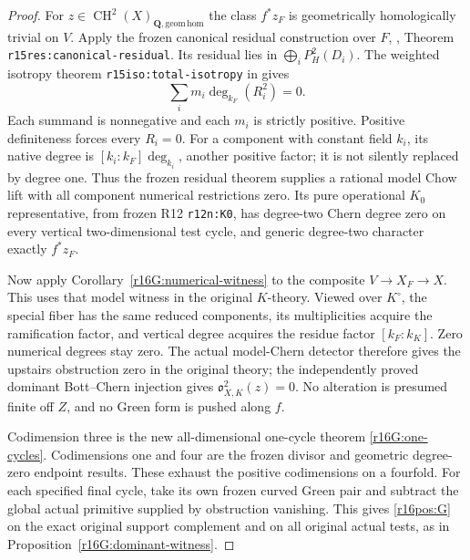\begin{proof}
For $z\in\operatorname{CH}^2(X)_{\mathbf Q,\mathrm{geom\,hom}}$
the class $f^*z_F$ is geometrically homologically trivial on $V$.
Apply the frozen canonical residual construction over $F$,
,
Theorem \texttt{r15res:canonical-residual}. Its residual lies in
$\bigoplus_iP_H^2(D_i)$. The weighted isotropy theorem
\texttt{r15iso:total-isotropy} in
 gives
\[
              \sum_i m_i\deg_{k_F}(R_i^2)=0.
 \tag{PP16.5}\label{r16pos:weighted-zero}
\]
Each summand is nonnegative and each $m_i$ is strictly positive.
Positive definiteness forces every $R_i=0$. For a component
with constant field $k_i$, its native degree is
$[k_i:k_F]\deg_{k_i}$, another positive factor; it is not
silently replaced by degree one. Thus the frozen residual
theorem supplies a rational model Chow lift with all component
numerical restrictions zero. Its pure operational $K_0$
representative, from frozen R12 \texttt{r12n:K0}, has
degree-two Chern degree zero on every vertical two-dimensional
test cycle, and generic degree-two character exactly $f^*z_F$.

Now apply Corollary~\ref{r16G:numerical-witness} to the composite
$V\to X_F\to X$. This uses that model witness in the original
$K$-theory. Viewed over $K^\circ$, the special fiber has the
same reduced components, its multiplicities acquire the
ramification factor, and vertical degree acquires the residue
factor $[k_F:k_K]$. Zero numerical degrees stay zero. The
actual model-Chern detector therefore gives the upstairs
obstruction zero in the original theory; the independently
proved dominant Bott--Chern injection gives
$\mathfrak o_{X,K}^2(z)=0$. No alteration is presumed finite
off $Z$, and no Green form is pushed along $f$.

Codimension three is the new all-dimensional one-cycle theorem
\ref{r16G:one-cycles}. Codimensions one and four are the
frozen divisor and geometric degree-zero endpoint results.
These exhaust the positive codimensions on a fourfold.
For each specified final cycle, take its own frozen curved
Green pair and subtract the global actual primitive supplied
by obstruction vanishing. This gives \eqref{r16pos:G} on
the exact original support complement and on all original
actual tests, as in Proposition~\ref{r16G:dominant-witness}.
\end{proof}

